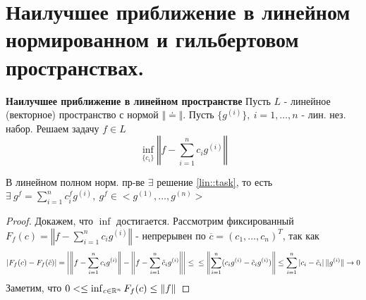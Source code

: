 \section{Наилучшее приближение в линейном нормированном и гильбертовом пространствах.}
\textbf{Наилучшее приближение в линейном пространстве}
Пусть $L$ - линейное (векторное) пространство с нормой $\Vert\doteq\Vert$.
Пусть $\{g^{(i)}\},\ i=1,\ldots,n$ - лин. нез. набор.
Решаем задачу $f\in L$
\begin{equation}\label{lin::task}
  \inf_{\{c_i\}}\left\Vert f-\sum_{i=1}^nc_ig^{(i)}\right\Vert
\end{equation}
\begin{theorem}
  В линейном полном норм. пр-ве $\exists$ решение \eqref{lin::task}, то есть $\exists\ g^f=\sum_{i=1}^nc_i^fg^{(i)},\ g^f\in<g^{(1)},\ldots,g^{(n)}>$
\end{theorem}
\begin{proof}
  Докажем, что $\inf$ достигается.
  Рассмотрим фиксированный $F_f(c)=\left\Vert f-\sum_{i=1}^nc_ig^{(i)}\right\Vert$ - непрерывен по $\overline{c}=(c_1,\ldots,c_n)^T$, так как
  \begin{equation*}
    \left|F_f(c)-F_f(\tilde{c})\right|=\left|\left\Vert f-\sum_{i=1}^nc_ig^{(i)}\right\Vert-\left\Vert f-\sum_{i=1}^n\tilde{c}_ig^{(i)}\right\Vert\right|\leq\\
    \leq \left\Vert \sum_{i=1}^n(c_ig^{(i)}-\tilde{c}_ig^{(i)})\right\Vert\leq\sum_{i=1}^n\left|c_i-\tilde{c}_i\right|\Vert g^{(i)}\Vert\rightarrow0
  \end{equation*}
  Заметим, что $0<\leq\inf_{c\in\mathbb{R}^n}F_f(c)\leq\Vert f\Vert$
\end{proof}

